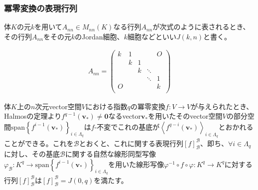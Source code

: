 \documentclass[dvipdfmx]{jsarticle}
\begin{document}
\subsubsection{冪零変換の表現行列}%
\begin{dfn}\label{Jordan細胞の定義}
体$K$の元$k$を用いて$A_{nn} \in M_{nn}(K)$なる行列$A_{nn}$が次式のように表されるとき、その行列$A_{nn}$をその元$k$のJordan細胞、$k$細胞などといい$J(k,n)$と書く。
\end{dfn}
\begin{align*}
A_{nn} = \begin{pmatrix}
k & 1 & \  & \  & O \\
\  & k & 1 & \  & \  \\
\  & \  & k & \ddots & \  \\
\  & \  & \  & \ddots & 1 \\
O & \  & \  & \  & k \\
\end{pmatrix}
\end{align*}
\begin{thm}\label{2.2.5.8}
体$K$上の$n$次元vector空間$V$における指数$q$の冪零変換$f:V \rightarrow V$が与えられたとき、Halmosの定理より$f^{q - 1}\left( \mathbf{v}_{*} \right) \neq \mathbf{0}$なるvector$\mathbf{v}_{*}$を用いたそのvector空間$V$の部分空間${\mathrm{span}}\left\{ f^{i - 1}\left( \mathbf{v}_{*} \right) \right\}_{i \in \varLambda_{q}}$は$f$-不変でこれの基底が$\left\langle f^{q - i}\left( \mathbf{v}_{*} \right) \right\rangle_{i \in \varLambda_{q}}$とおかれることができる。これを$\mathcal{B}$とおくと、これに関する表現行列$[ f]_{\mathcal{B}}^{\mathcal{B}}$、即ち、$\forall i \in \varLambda_{q}$に対し、その基底$\mathcal{B}$に関する自然な線形同型写像$\varphi_{\mathcal{B}}:K^{q} \rightarrow {\mathrm{span}}\left\{ f^{i - 1}\left( \mathbf{v}_{*} \right) \right\}_{i \in \varLambda_{q}}$を用いた線形写像$\varphi^{- 1} \circ f \circ \varphi:K^{q} \rightarrow K^{q}$に対する行列$[ f]_{\mathcal{B}}^{\mathcal{B}}$は$[ f]_{\mathcal{B}}^{\mathcal{B}} = J(0,q)$を満たす。
\end{thm}
\end{document}
